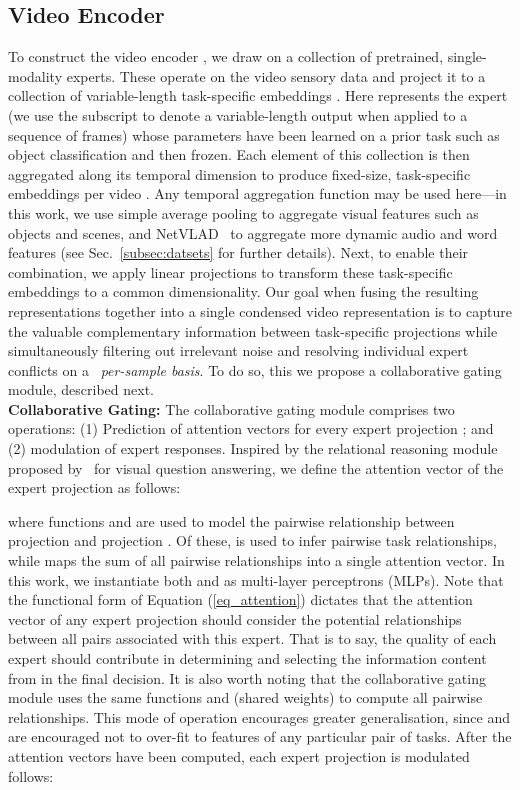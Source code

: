 \documentclass{bmvc2k}
\begin{document}
\subsection{Video Encoder} \label{subsec:video-encoder}
To construct the video encoder , we draw on a collection of pretrained, single-modality experts.  These operate on the video sensory data  and project it to a collection of  variable-length task-specific embeddings . Here  represents the  expert (we use the  subscript to denote a variable-length output when applied to a sequence of frames) whose parameters have been learned on a prior task such as object classification and then frozen.  Each element of this collection is then aggregated along its temporal dimension to produce fixed-size, task-specific embeddings per video .  Any temporal aggregation function may be used here---in this work, we use simple average pooling to aggregate  visual features such as objects and scenes, and NetVLAD~\cite{arandjelovic2016netvlad} to aggregate more dynamic audio and word features (see Sec.~\ref{subsec:datsets} for further details). Next, to enable their combination, we apply linear projections to transform these task-specific embeddings to a common dimensionality. Our goal when fusing the resulting representations together into a single condensed video representation is to capture the valuable complementary information between task-specific projections while simultaneously filtering out irrelevant noise and resolving individual expert conflicts on a ~\textit{per-sample basis}. To do so, this we propose a collaborative gating module, described next. \\

\noindent\textbf{Collaborative Gating:} The collaborative gating module comprises two operations: (1) Prediction of attention vectors for every expert projection ; and (2) modulation of expert responses.  Inspired by the relational reasoning module proposed by~\cite{santoro2017simple} for visual question answering, we define the attention vector of the  expert projection  as follows:
 
where functions  and  are used to model the pairwise relationship between projection  and projection . Of these,  is used to infer pairwise task relationships, while  maps the sum of all pairwise relationships into a single attention vector.  In this work, we instantiate both  and  as multi-layer perceptrons (MLPs). Note that the functional form of Equation (\ref{eq_attention}) dictates that the attention vector of any expert projection should consider the potential relationships between all pairs associated with this expert. That is to say, the quality of each expert  should contribute in determining and selecting the information content from  in the final decision.  It is also worth noting that the collaborative gating module uses the same functions  and  (shared weights) to compute all pairwise relationships. This mode of operation encourages greater generalisation, since  and  are encouraged not to over-fit to features of any particular pair of tasks.  
After the attention vectors   have been computed, each expert projection is modulated follows:
\end{document}
